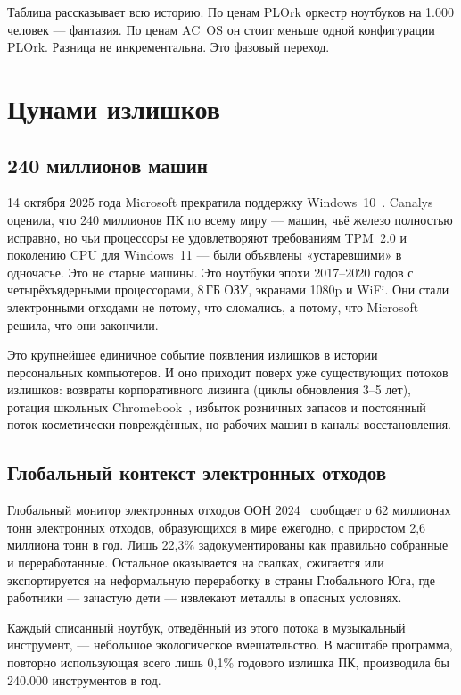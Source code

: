 \documentclass[10pt,letterpaper,twocolumn]{article}
\begin{document}
Таблица рассказывает всю историю. По ценам PLOrk оркестр ноутбуков на 1.000 человек --- фантазия. По ценам AC~OS он стоит меньше одной конфигурации PLOrk. Разница не инкрементальна. Это фазовый переход.


\section{Цунами излишков}
\label{sec:surplus}

\subsection{240 миллионов машин}

14 октября 2025 года Microsoft прекратила поддержку Windows~10~\citep{canalys2024windows}. Canalys оценила, что 240 миллионов ПК по всему миру --- машин, чьё железо полностью исправно, но чьи процессоры не удовлетворяют требованиям TPM~2.0 и поколению CPU для Windows~11 --- были объявлены «устаревшими» в одночасье. Это не старые машины. Это ноутбуки эпохи 2017--2020 годов с четырёхъядерными процессорами, 8\,ГБ ОЗУ, экранами 1080p и WiFi. Они стали электронными отходами не потому, что сломались, а потому, что Microsoft решила, что они закончили.

Это крупнейшее единичное событие появления излишков в истории персональных компьютеров. И оно приходит поверх уже существующих потоков излишков: возвраты корпоративного лизинга (циклы обновления 3--5 лет), ротация школьных Chromebook~\citep{pirg2023chromebook}, избыток розничных запасов и постоянный поток косметически повреждённых, но рабочих машин в каналы восстановления.

\subsection{Глобальный контекст электронных отходов}

Глобальный монитор электронных отходов ООН 2024~\citep{forti2024ewaste} сообщает о 62 миллионах тонн электронных отходов, образующихся в мире ежегодно, с приростом 2,6 миллиона тонн в год. Лишь 22,3\% задокументированы как правильно собранные и переработанные. Остальное оказывается на свалках, сжигается или экспортируется на неформальную переработку в страны Глобального Юга, где работники --- зачастую дети --- извлекают металлы в опасных условиях.

Каждый списанный ноутбук, отведённый из этого потока в музыкальный инструмент, --- небольшое экологическое вмешательство. В масштабе программа, повторно использующая всего лишь 0,1\% годового излишка ПК, производила бы 240.000 инструментов в год.
\end{document}
